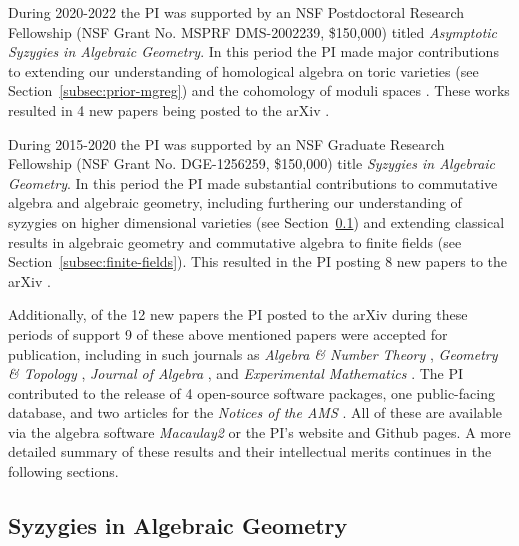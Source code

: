 \documentclass[11pt,reqno]{amsart}
\theoremstyle{remark}
\begin{document}
During 2020-2022 the PI was supported by an NSF Postdoctoral Research Fellowship (NSF Grant No. MSPRF DMS-2002239, \$150,000) titled \textit{Asymptotic Syzygies in Algebraic Geometry}. In this period the PI made major contributions to extending our understanding of homological algebra on toric varieties (see Section~\ref{subsec:prior-mgreg}) and the cohomology of moduli spaces \cite{BBCMMW22}. These works resulted in 4 new papers being posted to the arXiv \cite{BCEGLY22,bruceHellerSayrafi21,bruceHellerSayrafi22,BBCMMW22}.

During 2015-2020 the PI was supported by an NSF Graduate Research Fellowship (NSF Grant No. DGE-1256259, \$150,000) title \textit{Syzygies in Algebraic Geometry}. In this period the PI made substantial contributions to commutative algebra and algebraic geometry, including furthering our understanding of syzygies on higher dimensional varieties (see Section~\ref{subsec:prior-syzygies}) and extending classical results in algebraic geometry and commutative algebra to finite fields (see Section~\ref{subsec:finite-fields}). This resulted in the PI posting 8 new papers to the arXiv \cite{almousaBruce19,BBBKR17,bruceErman-sop,bruceLi19,bruceErmanGoldsteinYang18,bruceErman19,bruce19-semiample,bruce19-hirzebruch}.

Additionally, of the 12 new papers the PI posted to the arXiv during these periods of support 9 of these above mentioned papers were accepted for publication, including in such journals as \textit{Algebra \& Number Theory} \cite{bruceErman-sop}, \textit{Geometry \& Topology} \cite{BBCMMW22}, \textit{Journal of Algebra} \cite{BCEGLY22}, and \textit{Experimental Mathematics} \cite{bruceErmanGoldsteinYang18}. The PI contributed to the release of 4 open-source software packages, one public-facing database, and two articles for the \textit{Notices of the AMS} \cite{bruceNotices21,bruceNotices22}. All of these are available via the algebra software \textit{Macaulay2} or the PI's website and Github pages. A more detailed summary of these results and their intellectual merits continues in the following sections. 


\subsection{Syzygies in Algebraic Geometry}\label{subsec:prior-syzygies}
\end{document}
